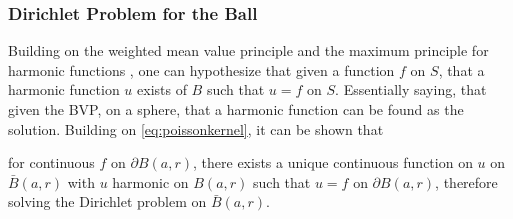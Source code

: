   \subsubsection{Dirichlet Problem for the Ball}
  Building on the weighted mean value principle and the maximum principle for harmonic functions
  , one can hypothesize that given a function $f$ on $S$, that a harmonic function $u$
  exists of $B$ such that $u = f$ on $S$. Essentially saying, that given the \gls{BVP},
  on a sphere, that a harmonic function can be found as the solution.  Building on
  \ref{eq:poissonkernel}, it can be shown that
\begin{theorem}
  for continuous $f$ on  $\partial B(a,r)$,
there exists a unique continuous function on $u$ on $\bar{B}(a,r)$ with $u$ harmonic on
$B(a,r)$ such that $ u = f $ on
$\partial B(a,r)$, therefore solving the Dirichlet problem on $\bar{B}(a,r)$\cite{Axler1992}.
\end{theorem}

